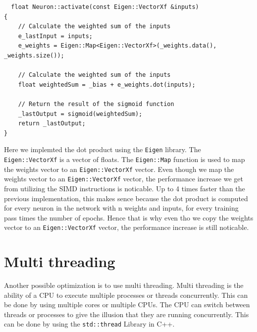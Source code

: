 \documentclass[twoside]{article}
\begin{document}
\begin{lstlisting}
  float Neuron::activate(const Eigen::VectorXf &inputs)
{
    // Calculate the weighted sum of the inputs
    e_lastInput = inputs;
    e_weights = Eigen::Map<Eigen::VectorXf>(_weights.data(), _weights.size());

    // Calculate the weighted sum of the inputs
    float weightedSum = _bias + e_weights.dot(inputs);

    // Return the result of the sigmoid function
    _lastOutput = sigmoid(weightedSum);
    return _lastOutput;
}
\end{lstlisting}
Here we implemted the dot product using the \texttt{Eigen} library. The \texttt{Eigen::VectorXf} is a vector of floats.
The \texttt{Eigen::Map} function is used to map the weights vector to an \texttt{Eigen::VectorXf} vector.
Even though we map the weights vector to an \texttt{Eigen::VectorXf} vector, the performance increase we get from utilizing the SIMD instructions is noticable.
Up to 4 times faster than the previous implementation,
this makes sence because the dot product is computed for every neuron in the network with n weights and inputs, for every training pass times the number of epochs.
Hence that is why even tho we copy the weights vector to an \texttt{Eigen::VectorXf} vector, the performance increase is still noticable.

\newpage
\section{Multi threading}
Another possible optimization is to use multi threading. Multi threading is the ability of a CPU to execute multiple processes or threads concurrently.
This can be done by using multiple cores or multiple CPUs. The CPU can switch between threads or processes to give the illusion that they are running concurrently.
This can be done by using the \texttt{std::thread} Library in C++.


\newpage


\end{document}
